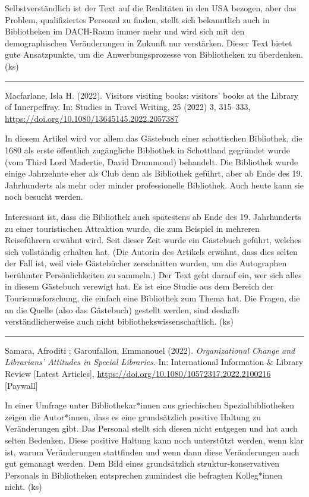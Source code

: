 \documentclass[a4paper,
fontsize=11pt,
oneside,
numbers=noperiodatend,
parskip=half-,
bibliography=totoc,
final
]{scrartcl}
\begin{document}
Selbstverständlich ist der Text auf die Realitäten in den USA bezogen,
aber das Problem, qualifiziertes Personal zu finden, stellt sich
bekanntlich auch in Bibliotheken im DACH-Raum immer mehr und wird sich
mit den demographischen Veränderungen in Zukunft nur verstärken. Dieser
Text bietet gute Ansatzpunkte, um die Anwerbungsprozesse von
Bibliotheken zu überdenken. (ks)

\begin{center}\rule{0.5\linewidth}{0.5pt}\end{center}

Macfarlane, Isla H. (2022). Visitors visiting books: visitors' books at
the Library of Innerpeffray. In: Studies in Travel Writing, 25 (2022) 3,
315--333, \url{https://doi.org/10.1080/13645145.2022.2057387}

In diesem Artikel wird vor allem das Gästebuch einer schottischen
Bibliothek, die 1680 als erste öffentlich zugängliche Bibliothek in
Schottland gegründet wurde (vom Third Lord Madertie, David Drummond)
behandelt. Die Bibliothek wurde einige Jahrzehnte eher als Club denn als
Bibliothek geführt, aber ab Ende des 19. Jahrhunderts als mehr oder
minder professionelle Bibliothek. Auch heute kann sie noch besucht
werden.

Interessant ist, dass die Bibliothek auch spätestens ab Ende des 19.
Jahrhunderts zu einer touristischen Attraktion wurde, die zum Beispiel
in mehreren Reiseführern erwähnt wird. Seit dieser Zeit wurde ein
Gästebuch geführt, welches sich vollständig erhalten hat. (Die Autorin
des Artikels erwähnt, dass dies selten der Fall ist, weil viele
Gästebücher zerschnitten wurden, um die Autographen berühmter
Persönlichkeiten zu sammeln.) Der Text geht darauf ein, wer sich alles
in diesem Gästebuch verewigt hat. Es ist eine Studie aus dem Bereich der
Tourismusforschung, die einfach eine Bibliothek zum Thema hat. Die
Fragen, die an die Quelle (also das Gästebuch) gestellt werden, sind
deshalb verständlicherweise auch nicht bibliothekswissenschaftlich. (ks)

\begin{center}\rule{0.5\linewidth}{0.5pt}\end{center}

Samara, Afroditi ; Garoufallou, Emmanouel (2022). \emph{Organizational
Change and Librarians' Attitudes in Special Libraries}. In:
International Information \& Library Review {[}Latest Articles{]},
\url{https://doi.org/10.1080/10572317.2022.2100216} {[}Paywall{]}

In einer Umfrage unter Bibliothekar*innen aus griechischen
Spezialbibliotheken zeigen die Autor*innen, dass es eine grundsätzlich
positive Haltung zu Veränderungen gibt. Das Personal stellt sich diesen
nicht entgegen und hat auch selten Bedenken. Diese positive Haltung kann
noch unterstützt werden, wenn klar ist, warum Veränderungen stattfinden
und wenn dann diese Veränderungen auch gut gemanagt werden. Dem Bild
eines grundsätzlich struktur-konservativen Personals in Bibliotheken
entsprechen zumindest die befragten Kolleg*innen nicht. (ks)
\end{document}
